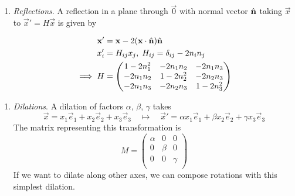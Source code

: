 \documentclass{../template/note}
\begin{document}
\begin{enumerate}
\begin{enumerate}
            DIAGRAM: perpendicular vectors \(\vec x_\perp\) and \(\hvec n \times \vec x\), angle \(\theta\) between \(\vec x_\perp\) and \(\vec x'_\perp\).

            We denote this (counter-clockwise) rotation by \(\Rot(\theta, \hvec n)\).
            
            
        \end{enumerate}
        \item \emph{Reflections}. A reflection in a plane through \(\vec 0\) with normal vector \(\hvec n\) taking \(\vec x\) to \(\vec x' = H\vec x\) is given by

        \begin{align*}
            \vec x' &= \vec x - 2(\vec x \cdot \hvec n) \hvec n \\
            x_i' &=  H_{ij}x_j, \; H_{ij} = \delta_{ij} - 2n_in_j \\
            \implies H &= \begin{pmatrix}
             1-2n_1^2 & -2n_1n_2 & -2n_1n_3 \\
             -2n_1n_2 & 1-2n_2^2 & -2n_2n_3 \\
             -2n_1n_3 & -2n_2n_3 & 1-2n_3^2 \\
            \end{pmatrix}
        \end{align*}        
    \end{enumerate}
    

    \begin{enumerate}[resume]
        \item \emph{Dilations}. A dilation of factors \(\alpha\), \(\beta\), \(\gamma\) takes
        \[
            \vec x = x_1 \vec e_1 + x_2 \vec e_2 + x_3 \vec e_3 \quad \longmapsto \quad \vec x' = \alpha x_1 \vec e_1 + \beta x_2 \vec e_2 + \gamma x_3 \vec e_3
        \]
        The matrix representing this transformation is
        \[
            M = \begin{pmatrix}
             \alpha & 0 & 0 \\
             0 & \beta & 0 \\
             0 & 0 & \gamma \\
            \end{pmatrix}
        \]
        If we want to dilate along other axes, we can compose rotations with this simplest dilation.
    \end{enumerate}
    
\end{document}
